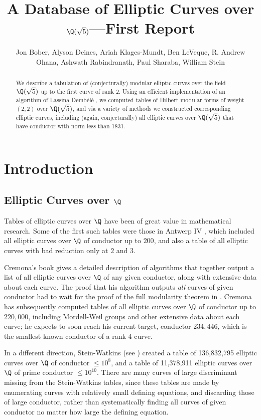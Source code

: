 \documentclass{amsart}
\title{A Database of Elliptic Curves over $\Q(\sqrt{5})$---First Report}
\author[Bober et al.]{Jon Bober, Alyson Deines, Ariah Klages-Mundt, Ben
  LeVeque, R. Andrew Ohana, Ashwath Rabindranath, Paul Sharaba, William
  Stein}
\newcommand{\dembele}{Demb\'el{\'e}\xspace}
\begin{document}
\begin{abstract} 
  We describe a tabulation of (conjecturally) modular elliptic curves
  over the field $\Q(\sqrt5)$ up to the first curve of rank $2$. Using
  an efficient implementation of an algorithm of Lassina \dembele
  \cite{dembele:hilbert5}, we computed tables of Hilbert modular
  forms of weight $(2,2)$ over $\Q(\sqrt 5)$, and via a variety of
  methods we constructed corresponding elliptic curves, including
  (again, conjecturally) all elliptic curves over $\Q(\sqrt5)$ that
  have conductor with norm less than 1831.
\end{abstract} 

\maketitle

\section{Introduction}\label{sec:intro}

\subsection{Elliptic Curves over $\Q$}
Tables of elliptic curves over $\Q$ have been of great value in
mathematical research.  Some of the first such tables were those in
Antwerp IV \cite{antwerpiv}, which included all elliptic curves over
$\Q$ of conductor up to $200$, and also a table of all elliptic curves
with bad reduction only at $2$ and $3$.  

Cremona's book \cite{cremona:algs} gives a detailed description of
algorithms that together output a list of all elliptic curves over
$\Q$ of any given conductor, along with extensive data about each
curve.  The proof that his algorithm outputs {\em all} curves of given
conductor had to wait for the proof of the full modularity theorem in
\cite{breuil-conrad-diamond-taylor}.  Cremona has subsequently
computed tables \cite{cremona:onlinetables} of all elliptic curves
over $\Q$ of conductor up to $220,\!000$, including Mordell-Weil
groups and other extensive data about each curve; he expects to soon
reach his current target, conductor $234,\!446$, which is the smallest
known conductor of a rank $4$ curve.

In a different direction, Stein-Watkins (see \cite{stein-watkins:ants5, bmsw:bulletins}) 
created a table of 136,832,795 elliptic curves over $\Q$ of conductor $\leq 10^8$, and a
table of 11,378,911 elliptic curves over $\Q$ of prime conductor $\leq
10^{10}$. 
There are many curves of large discriminant missing from the
Stein-Watkins tables, since these tables are made by enumerating
curves with relatively small defining equations, and discarding those
of large conductor, rather than systematically finding all curves of
given conductor no matter how large the defining equation.
\end{document}
